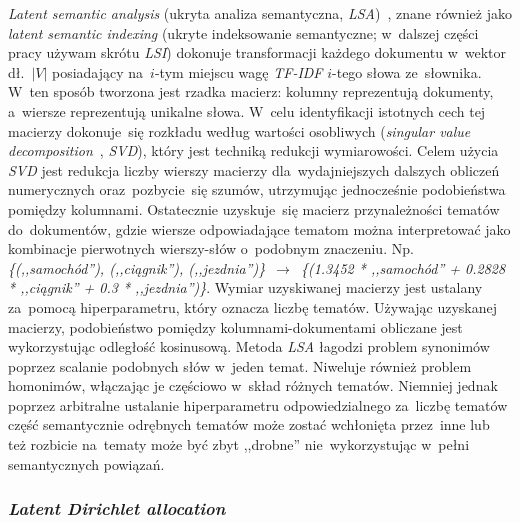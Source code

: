 \documentclass[pl]{minipw} %
\begin{document}
\textit{Latent semantic analysis} (ukryta analiza semantyczna, \textit{LSA})~\cite{lsa}, znane również jako \textit{latent semantic indexing} (ukryte indeksowanie semantyczne; w~dalszej części pracy używam skrótu \textit{LSI}) dokonuje transformacji każdego dokumentu w~wektor dł.~$|V|$ posiadający na~$i$-tym miejscu wagę \textit{TF-IDF} $i$-tego słowa ze~słownika. W~ten sposób tworzona jest rzadka macierz: kolumny reprezentują dokumenty, a~wiersze reprezentują unikalne słowa. W~celu identyfikacji istotnych cech tej macierzy dokonuje~się rozkładu według wartości osobliwych (\textit{singular value decomposition}~\cite{svd}, \textit{SVD}), który jest techniką redukcji wymiarowości. Celem użycia \textit{SVD} jest redukcja liczby wierszy macierzy dla~wydajniejszych dalszych obliczeń numerycznych oraz~pozbycie~się szumów, utrzymując jednocześnie podobieństwa pomiędzy kolumnami. Ostatecznie uzyskuje~się macierz przynależności tematów do~dokumentów, gdzie wiersze odpowiadające tematom można interpretować jako kombinacje pierwotnych wierszy-słów o~podobnym znaczeniu. Np. \textit{\{(,,samochód''), (,,ciągnik''), (,,jezdnia'')\}}~$\to$~\textit{\{(1.3452 * ,,samochód'' + 0.2828 * ,,ciągnik'' + 0.3 * ,,jezdnia'')\}}. Wymiar uzyskiwanej macierzy jest ustalany za~pomocą hiperparametru, który oznacza liczbę tematów. Używając uzyskanej macierzy, podobieństwo pomiędzy kolumnami-dokumentami obliczane jest wykorzystując odległość kosinusową. Metoda \textit{LSA} łagodzi problem synonimów poprzez scalanie podobnych słów w~jeden temat. Niweluje również problem homonimów, włączając je częściowo w~skład różnych tematów. Niemniej jednak poprzez arbitralne ustalanie hiperparametru odpowiedzialnego za~liczbę tematów część semantycznie odrębnych tematów może zostać wchłonięta przez~inne lub też rozbicie na~tematy może być zbyt ,,drobne'' nie~wykorzystując w~pełni semantycznych powiązań.


\subsubsection{\textit{Latent Dirichlet allocation}}
\end{document}

